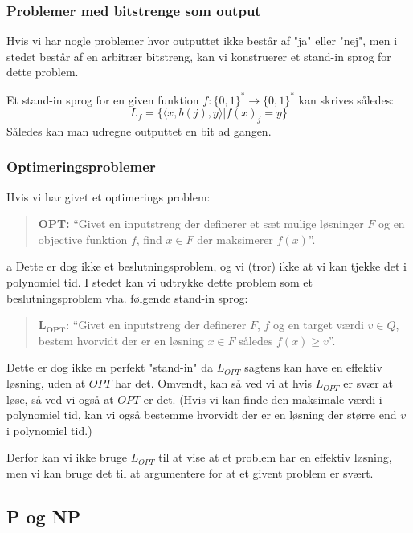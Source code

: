 \documentclass[danish,a4paper,article,12pt]{article}
\begin{document}
\subsubsection{Problemer med bitstrenge som output}
Hvis vi har nogle problemer hvor outputtet ikke består af "ja" eller "nej", men i stedet består af en arbitrær bitstreng, kan vi konstruerer et stand-in sprog for dette problem.

Et stand-in sprog for en given funktion $f:\{0,1\}^* \rightarrow \{0,1\}^*$ kan skrives således:
\begin{equation}
L_f = \{\langle x,b(j),y \rangle |f(x)_j=y\}
\end{equation}
Således kan man udregne outputtet en bit ad gangen.

\subsubsection{Optimeringsproblemer}
Hvis vi har givet et optimerings problem:

\begin{quote}
\textbf{OPT:} “Givet en inputstreng der definerer et sæt mulige løsninger
$F$ og en objective funktion $f$, find $x\in F$ der maksimerer
$f(x)$”.
\end{quote}
a
Dette er dog ikke et beslutningsproblem, og vi (tror) ikke at vi kan tjekke det i polynomiel tid. I stedet kan vi udtrykke dette problem som et beslutningsproblem vha. følgende stand-in sprog:

\begin{quote}
$\mathbf{L_{OPT}}$: “Givet en inputstreng der definerer $F$, $f$ og en target
værdi $v \in Q$, bestem hvorvidt der er en løsning $x \in F$ således
$f(x) \geq v$”.
\end{quote}

Dette er dog ikke en perfekt "stand-in" da $L_{OPT}$ sagtens kan have en effektiv løsning, uden at $OPT$ har det. Omvendt, kan så ved vi at hvis $L_{OPT}$ er svær at løse, så ved vi også at $OPT$ er det. (Hvis vi kan finde den maksimale værdi i polynomiel tid, kan vi også bestemme hvorvidt der er en løsning der større end $v$ i polynomiel tid.)

Derfor kan vi ikke bruge $L_{OPT}$ til at vise at et problem har en effektiv løsning, men vi kan bruge det til at argumentere for at et givent problem er svært.

\subsection{P og NP}
\end{document}
